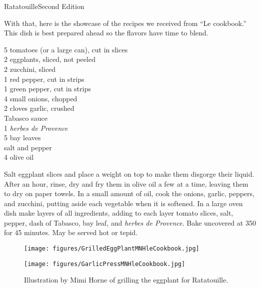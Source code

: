 \begin{entry}{Ratatouille}{Second Edition}
\begin{open}
With that, here is the showcase of the recipes we received from ``Le cookbook.''
This dish is best prepared ahead so the flavors have time to blend.
\end{open}
\begin{ingredients}
  5 tomatoes (or a large can), cut in slices\\
  2 eggplants, sliced, not peeled \\
  2 zucchini, sliced \\
  1 red pepper, cut in strips \\
  1 green pepper, cut in strips \\
  4 small onions, chopped \\
  2 cloves garlic, crushed \\
  Tabasco sauce \\
  \SI{1}{\tblspoon} \emph{herbes de Provence} \\
  5 bay leaves \\
  salt and pepper \\
  \SI{4}{\tblspoon} olive oil
\end{ingredients}
Salt eggplant slices and place a weight on top to make them disgorge their liquid. After an hour, rinse, dry and fry them in olive oil a few at a time, leaving them to dry on paper towels. In a small amount of oil, cook the onions, garlic, peppers, and zucchini, putting aside each vegetable when it is softened. In a large oven dish make layers of all ingredients, adding to each layer tomato slices, salt, pepper, dash of Tabasco, bay leaf, and \emph{herbes de Provence}. Bake uncovered at \SI{350}{\degreeF} for 45 minutes. May be served hot or tepid.
\begin{figure}
  \centering
  \texttt{[image: figures/GrilledEggPlantMNHleCookbook.jpg]}
  \caption{}
  \label{fig:mimi_eggplant}
\end{figure}

\begin{figure}
  \centering
  \texttt{[image: figures/GarlicPressMNHleCookbook.jpg]}
  \caption{Illustration by Mimi Horne of grilling the eggplant for Ratatouille.}
  \label{fig:mimi_garlic}
\end{figure}

\end{entry}

